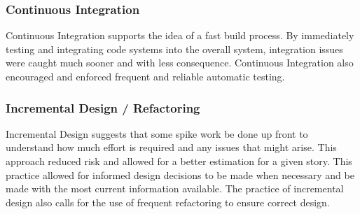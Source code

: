 \subsubsection{Continuous Integration}
Continuous Integration supports the idea of a fast build process. By immediately testing and integrating code systems into the overall system, integration issues were caught much sooner and with less consequence. Continuous Integration also encouraged and enforced frequent and reliable automatic testing.

\subsubsection{Incremental Design / Refactoring}
Incremental Design suggests that some spike work be done up front to understand how much effort is required and any issues that might arise. This approach reduced risk and allowed for a better estimation for a given story. This practice allowed for informed design decisions to be made when necessary and be made with the most current information available. The practice of incremental design also calls for the use of frequent refactoring to ensure correct design.

